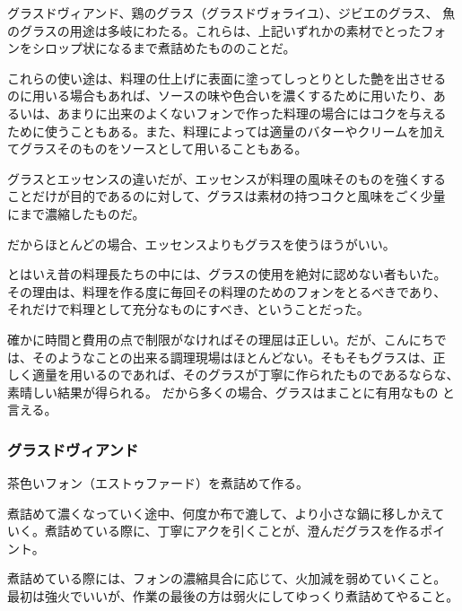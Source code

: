 \begin{recette}


グラスドヴィアンド、鶏のグラス（グラスドヴォライユ）、ジビエのグラス、
魚のグラスの用途は多岐にわたる。これらは、上記いずれかの素材でとったフォ
ンをシロップ状になるまで煮詰めたもののことだ。

これらの使い途は、料理の仕上げに表面に塗ってしっとりとした艶を出させる
のに用いる場合もあれば、ソースの味や色合いを濃くするために用いたり、あ
るいは、あまりに出来のよくないフォンで作った料理の場合にはコクを与える
ために使うこともある。また、料理によっては適量のバターやクリームを加え
てグラスそのものをソースとして用いることもある。

グラスとエッセンスの違いだが、エッセンスが料理の風味そのものを強くする
ことだけが目的であるのに対して、グラスは素材の持つコクと風味をごく少量
にまで濃縮したものだ。

だからほとんどの場合、エッセンスよりもグラスを使うほうがいい。

とはいえ昔の料理長たちの中には、グラスの使用を絶対に認めない者もいた。
その理由は、料理を作る度に毎回その料理のためのフォンをとるべきであり、
それだけで料理として充分なものにすべき、ということだった。

確かに時間と費用の点で制限がなければその理屈は正しい。だが、こんにちで
は、そのようなことの出来る調理現場はほとんどない。そもそもグラスは、正
しく適量を用いるのであれば、そのグラスが丁寧に作られたものであるならな、
素晴しい結果が得られる。 だから多くの場合、グラスはまことに有用なもの
と言える。

\hypertarget{glace-de-viande}{%
\subsubsection{グラスドヴィアンド}\label{glace-de-viande}}



茶色いフォン（エストゥファード）を煮詰めて作る。

煮詰めて濃くなっていく途中、何度か布で漉して、より小さな鍋に移しかえて
いく。煮詰めている際に、丁寧にアクを引くことが、澄んだグラスを作るポイ
ント。

煮詰めている際には、フォンの濃縮具合に応じて、火加減を弱めていくこと。
最初は強火でいいが、作業の最後の方は弱火にしてゆっくり煮詰めてやること。


\end{recette}

